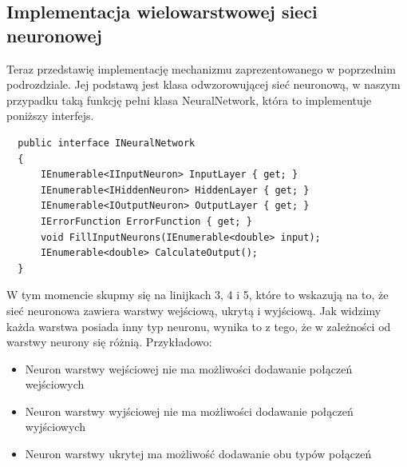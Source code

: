 \subsection{Implementacja wielowarstwowej sieci neuronowej}

Teraz przedstawię implementację mechanizmu zaprezentowanego w poprzednim podrozdziale.
Jej podstawą jest klasa odwzorowującej sieć neuronową, w naszym przypadku
taką funkcję pełni klasa NeuralNetwork, która to implementuje poniższy interfejs.

\begin{lstlisting} 
  public interface INeuralNetwork
  {
      IEnumerable<IInputNeuron> InputLayer { get; }
      IEnumerable<IHiddenNeuron> HiddenLayer { get; }
      IEnumerable<IOutputNeuron> OutputLayer { get; }
      IErrorFunction ErrorFunction { get; }
      void FillInputNeurons(IEnumerable<double> input);
      IEnumerable<double> CalculateOutput();
  }
\end{lstlisting}

W tym momencie skupmy się na linijkach 3, 4 i 5, które to wskazują na to, że sieć neuronowa zawiera warstwy wejściową, ukrytą i wyjściową.
Jak widzimy każda warstwa posiada inny typ neuronu, wynika to z tego, że w zależności od warstwy neurony się różnią. Przykładowo:
\begin{itemize}
  \item Neuron warstwy wejściowej nie ma możliwości dodawanie połączeń wejściowych
  \item Neuron warstwy wyjściowej nie ma możliwości dodawanie połączeń wyjściowych
  \item Neuron warstwy ukrytej ma możliwość dodawanie obu typów połączeń
\end{itemize}








